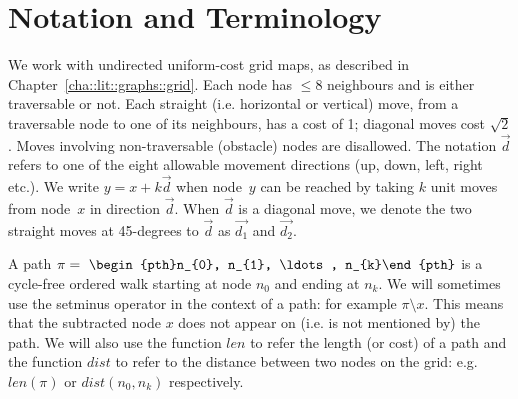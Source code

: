 \section{Notation and Terminology}
\label{sec:notation}
We work with undirected uniform-cost grid maps, as described in
Chapter~\ref{cha::lit::graphs::grid}.  Each node has $\leq 8$ neighbours and
is either traversable or not.  Each straight (i.e. horizontal or vertical)
move, from a traversable node to one of its neighbours, has a cost of 1;
diagonal moves cost $\sqrt 2$.  Moves involving non-traversable (obstacle)
nodes are disallowed.  The notation $\vec{d}$ refers to one of the eight
allowable movement directions (up, down, left, right etc.).  We write $y = x +
k\vec{d}$ when node~$y$ can be reached by taking $k$ unit moves from node~$x$
in direction $\vec{d}$.  When $\vec{d}$ is a diagonal move, we denote the two
straight moves at 45-degrees to $\vec{d}$ as $\vec{d_1}$ and $\vec{d_2}$.

A path $\pi =~\begin{pth}n_{0}, n_{1}, \ldots , n_{k}\end{pth}$ is a cycle-free
ordered walk starting at node $n_{0}$ and ending at $n_{k}$.  We will sometimes
use the setminus operator in the context of a path: for example $\pi \setminus
x$. This means that the subtracted node $x$ does not appear on (i.e. is not
mentioned by) the path.  We will also use the function $len$ to refer the length
(or cost) of a path and the function $dist$ to refer to the distance between two
nodes on the grid: e.g. $len(\pi)$ or $dist(n_{0}, n_{k})$ respectively.  



